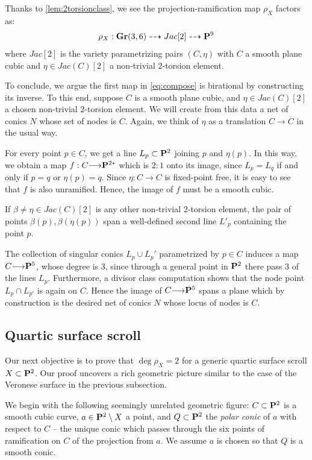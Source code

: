 \documentclass[11pt,reqno]{amsart}
\theoremstyle{plain}
\theoremstyle{definition}
\theoremstyle{remark}
\numberwithin{equation}{section}
\renewcommand{\to}{{\longrightarrow}}
\numberwithin{equation}{section}
\begin{document}
Thanks to \autoref{lem:2torsionclass}, we see the projection-ramification map $\rho_{X}$ factors as: 
\begin{align}\label{eq:compose}
  \rho_{X}: \Gr(3,6) \dashrightarrow Jac[2] \dashrightarrow \P^{9}
\end{align}
where $Jac[2]$ is the variety parametrizing pairs $(C,\eta)$ with $C$ a smooth plane cubic and $\eta \in Jac(C)[2]$ a non-trivial $2$-torsion element. 


To conclude, we argue the first map in \eqref{eq:compose} is birational by constructing its inverse.  To this end, suppose $C$ is a smooth plane cubic, and $\eta \in Jac(C)[2]$ a chosen non-trivial $2$-torsion element. We will create from this data a net of conics $N$ whose set of nodes is $C$. Again, we think of $\eta$ as a translation $C \to C$ in the usual way.

  For every point $p \in C$, we get a line $L_{p} \subset \P^{2}$ joining $p$ and $\eta(p)$. In this way, we obtain a map $f: C \to \P^{2*}$ which is $2:1$ onto its image, since $L_{p} = L_{q}$ if and only if $p=q$ or $\eta(p)=q$.  Since  $\eta:C \to C$ is fixed-point free, it is easy to see that $f$ is also unramified. Hence, the image of $f$ must be a smooth cubic. 

  If $\beta \neq \eta \in Jac(C)[2]$ is any other non-trivial 2-torsion element, the pair of points $\beta(p), \beta(\eta(p))$ span a well-defined second line $L'_{p}$ containing the point $p$.  

  The collection of singular conics $L_{p} \cup L_{p}'$ parametrized by $p \in C$ induces a map $C \to \P^{5}$, whose degree is $3$, since  through a general point in $\P^{2}$ there pass $3$ of the lines $L_{p}$.  Furthermore, a divisor class computation shows that the node point $L_{p} \cap L_{p'}$ is again on $C$. Hence the image of $C \to \P^{5}$ spans a plane which by construction is the desired net of conics $N$ whose locus of nodes is $C$.


\subsection{Quartic surface scroll} Our next objective is to prove that $ \deg \rho_{X} = 2$ for a generic quartic surface scroll $X \subset \P^{2}$.  Our proof uncovers a  rich geometric picture similar to the case of the Veronese surface in the previous subsection.  


We begin with the following seemingly unrelated geometric figure: $C \subset \P^{2}$ is a smooth cubic curve, $a \in \P^{2} \setminus X$ a point, and $Q \subset \P^{2}$ the {\sl polar conic} of $a$ with respect to $C$ -- the unique conic which passes through the six points of ramification on $C$ of the projection from $a$.   We assume $a$ is chosen so that $Q$ is a smooth conic. 
\end{document}
